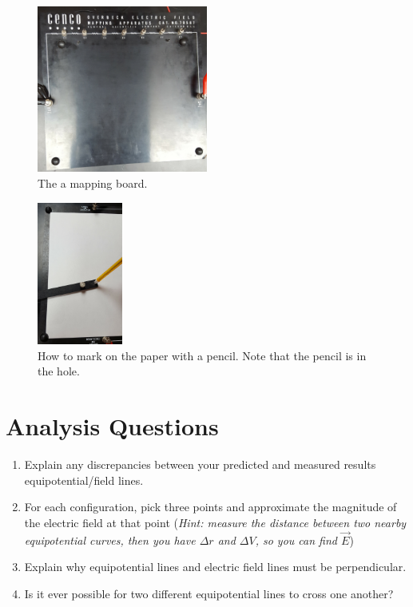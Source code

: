 \documentclass{article}
\begin{document}
\begin{figure}[hbt!]
	\begin{center}
		\includegraphics[width=0.5\textwidth]{mapping_board}
		\caption{The a mapping board.}
		\label{fig:mapping_board}
	\end{center}
\end{figure}

\begin{figure}[htb!]
	\begin{center}
		\includegraphics[width=0.25\textwidth]{pencil}
		\caption{How to mark on the paper with a pencil. Note that the pencil is in the hole.}
		\label{fig:pencil}
	\end{center}
\end{figure}



\section*{Analysis Questions}
\begin{enumerate}
	\item Explain any discrepancies between your predicted and measured results equipotential/field lines.
	\item For each configuration, pick three points and approximate the magnitude of the electric field at that point (\textit{Hint: measure the distance between two nearby equipotential curves, then you have $\Delta r$ and $\Delta V$, so you can find $\vec{E}$})
	\item Explain why equipotential lines and electric field lines must be perpendicular.
	\item Is it ever possible for two different equipotential lines to cross one another?
\end{enumerate}
\end{document}
